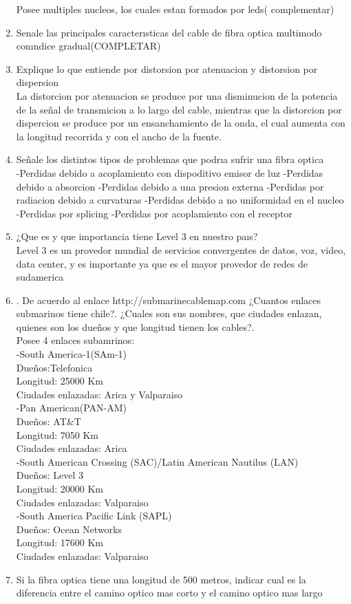 \documentclass{udparticle}
\begin{document}
\begin{enumerate}
  Posee multiples nucleos, los cuales estan formados por leds(  complementar)\\
  \item Senale las principales caracterısticas del cable de ﬁbra optica multimodo conındice gradual(COMPLETAR)\\
  \item Explique lo que entiende por distorsion por atenuacion y distorsion por dispersion\\
  La distorcion por atenuacion se produce por una disminucion de la potencia de la señal de transmicion a lo largo del cable, mientras que la distorcion por dispercion se produce por un ensanchamiento de la onda, el cual aumenta con la longitud recorrida y con el ancho de la fuente.\\
  \item Señale los distintos tipos de problemas que podrıa sufrir una ﬁbra optica\\
  -Perdidas debido a acoplamiento con dispoditivo emisor de luz
  -Perdidas debido a absorcion
  -Perdidas debido a una presion externa
  -Perdidas por radiacion debido a curvaturas 
  -Perdidas debido a no uniformidad en el nucleo
  -Perdidas por splicing
  -Perdidas por acoplamiento con el receptor
  \item ¿Que es y que importancia tiene Level 3 en nuestro paıs?\\
  Level 3 es un provedor mundial de servicios convergentes de datos, voz, video, data center, y es importante ya que es el mayor provedor de redes de sudamerica\\
  \item . De acuerdo al enlace http://submarinecablemap.com ¿Cuantos enlaces submarinos tiene chile?.
¿Cuales son sus nombres, que ciudades enlazan, quienes son los dueños y que longitud tienen
los cables?.\\
Posee 4 enlaces subamrinos:\\
-South America-1(SAm-1)\\
Dueños:Telefonica\\
Longitud: 25000 Km\\
Ciudades enlazadas: Arica y Valparaiso\\
-Pan American(PAN-AM)\\
Dueños: AT&T\\
Longitud: 7050 Km\\
Ciudades enlazadas: Arica\\
-South American Crossing (SAC)/Latin American Nautilus (LAN)\\
Dueños: Level 3\\
Longitud: 20000 Km\\
Ciudades enlazadas: Valparaiso\\
-South America Pacific Link (SAPL)\\
Dueños: Ocean Networks\\
Longitud: 17600 Km\\
Ciudades enlazadas: Valparaiso\\ 
\item Si la fibra optica tiene una longitud de 500 metros, indicar cual es la diferencia entre el camino 
optico mas corto y el camino  optico mas largo\\
  
  
    
    
\end{enumerate}
\end{document}
